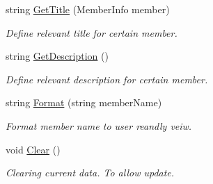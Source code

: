 \begin{DoxyCompactItemize}
string \mbox{\hyperlink{class_wpf_handler_1_1_u_i_1_1_g_u_i_content_a36c48561703ca7b73f21187ee9ff08bb}{Get\+Title}} (Member\+Info member)
\begin{DoxyCompactList}\small\item\em Define relevant title for certain member. \end{DoxyCompactList}\item 
string \mbox{\hyperlink{class_wpf_handler_1_1_u_i_1_1_g_u_i_content_a98ca8cae768fad4160df1aba48d6f7f6}{Get\+Description}} ()
\begin{DoxyCompactList}\small\item\em Define relevant description for certain member. \end{DoxyCompactList}\item 
string \mbox{\hyperlink{class_wpf_handler_1_1_u_i_1_1_g_u_i_content_ad37327acd55ad09e036f284970d1e022}{Format}} (string member\+Name)
\begin{DoxyCompactList}\small\item\em Format member name to user reandly veiw. \end{DoxyCompactList}\item 
void \mbox{\hyperlink{class_wpf_handler_1_1_u_i_1_1_g_u_i_content_ae691340b5a25a5497d9f64d4b0adddd6}{Clear}} ()
\begin{DoxyCompactList}\small\item\em Clearing current data. To allow update. \end{DoxyCompactList}\end{DoxyCompactItemize}

